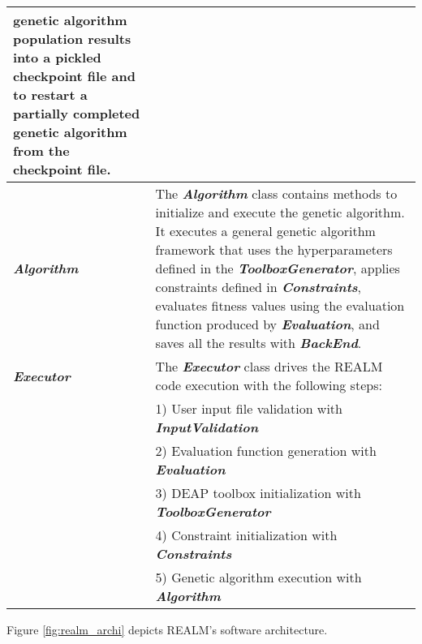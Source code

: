 \begin{table}[]
\begin{tabular}{l|p{}}
    genetic algorithm population results into a pickled checkpoint file and to 
    restart a partially completed genetic algorithm from the checkpoint file. \\
    \hline
    \textbf{\textit{Algorithm}} & The \textbf{\textit{Algorithm}} class contains methods to 
    initialize and execute the genetic algorithm. It executes a general genetic 
    algorithm framework that uses the hyperparameters defined in the 
    \textbf{\textit{ToolboxGenerator}}, applies constraints defined in
    \textbf{\textit{Constraints}}, evaluates fitness values using the evaluation 
    function produced by \textbf{\textit{Evaluation}}, and saves all the results 
    with \textbf{\textit{BackEnd}}. \\
    \hline
    \textbf{\textit{Executor}} & The \textbf{\textit{Executor}} class drives the \gls{REALM} code
    execution with the following steps: \\
    & 1) User input file validation with \textbf{\textit{InputValidation}} \\
    & 2) Evaluation function generation with \textbf{\textit{Evaluation}} \\
    & 3) DEAP toolbox initialization with \textbf{\textit{ToolboxGenerator}} \\ 
    & 4) Constraint initialization with \textbf{\textit{Constraints}} \\ 
    & 5) Genetic algorithm execution with \textbf{\textit{Algorithm}} \\
    \hline
    \end{tabular}
    \end{table}
Figure \ref{fig:realm_archi} depicts REALM's software architecture. 
